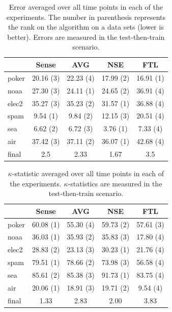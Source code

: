 \documentclass[10pt, conference]{IEEEtran}
\begin{document}
\begin{table}[p]
\caption{Error averaged over all time points in each of the experiments. The number in parenthesis represents the rank on the algorithm on a data sets (lower is better). Errors are measured in the test-then-train scenario.}\label{tab:err-ttt}
\begin{center}
\begin{tabular}{|l || c c c c |}
\hline
& \bf Sense &\bf AVG &\bf NSE &\bf FTL \\
\hline
\hline
poker & 20.16 (3) & 22.23 (4) & 17.99 (2) & 16.91 (1) \\ 
noaa & 27.30 (3) & 24.11 (1) & 24.65 (2) & 36.91 (4) \\ 
elec2 & 35.27 (3) & 35.23 (2) & 31.57 (1) & 36.88 (4) \\ 
spam & 9.54 (1) & 9.84 (2) & 12.15 (3) & 20.51 (4) \\ 
sea & 6.62 (2) & 6.72 (3) & 3.76 (1) & 7.33 (4) \\ 
air & 37.42 (3) & 37.11 (2) & 36.07 (1) & 42.68 (4) \\ 
\hline
\hline
final & 2.5 & 2.33 & 1.67 & 3.5 \\ 
\hline
\end{tabular}
\end{center}
\end{table}

\begin{table}[p]
\caption{$\kappa$-statistic averaged over all time points in each of the experiments. $\kappa$-statistics are measured in the test-then-train scenario.}\label{tab:kap-ttt}
\begin{center}
\begin{tabular}{|l || c c c c |}
\hline
& \bf Sense &\bf AVG &\bf NSE &\bf FTL \\
\hline
\hline
poker & 60.08 (1) & 55.30 (4) & 59.73 (2) & 57.61 (3) \\ 
noaa & 36.03 (1) & 35.93 (2) & 35.83 (3) & 17.80 (4) \\ 
elec2 & 28.83 (2) & 23.13 (3) & 30.23 (1) & 21.76 (4) \\ 
spam & 79.51 (1) & 78.66 (2) & 73.98 (3) & 56.58 (4) \\ 
sea & 85.61 (2) & 85.38 (3) & 91.73 (1) & 83.75 (4) \\ 
air & 20.06 (1) & 18.91 (3) & 19.71 (2) & 9.54 (4) \\ 
\hline
\hline
final & 1.33 & 2.83 & 2.00 & 3.83 \\ 
\hline
\end{tabular}
\end{center}
\end{table}
\end{document}
